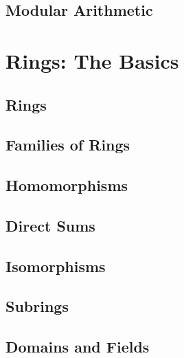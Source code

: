 \documentclass{memoir}
\begin{document}
    \section{Modular Arithmetic}
      \label{sec:int-mod-n}
      


  \chapter{Rings: The Basics}
    \label{chap:rings}
    
    \newpage

    \section{Rings}
      \label{sec:rings}
      
      \newpage

    \section{Families of Rings}
      \label{sec:ring-fams}
      
      \newpage

    \section{Homomorphisms}
      \label{sec:ring-homs}
      
      \newpage

    \section{Direct Sums}
      \label{sec:direct-sums}
      
      \newpage

    \section{Isomorphisms}
      \label{sec:ring-isos}
      
      \newpage

    \section{Subrings}
      \label{sec:subrings}
      
      \newpage

    \section{Domains and Fields}
      \label{sec:domains-and-fields}
      
      \newpage
\end{document}
